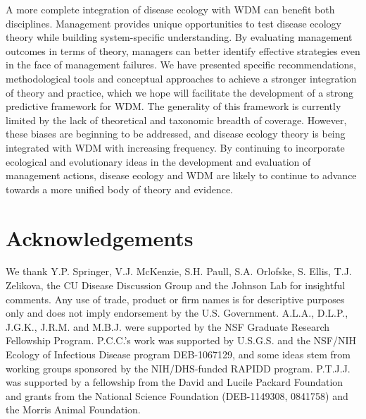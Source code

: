 A more complete integration of disease ecology with WDM can benefit both disciplines.
Management provides unique opportunities to test disease ecology theory while building system-specific understanding.
By evaluating management outcomes in terms of theory, managers can better identify effective strategies even in the face of management failures.
We have presented specific recommendations, methodological tools and conceptual approaches to achieve a stronger integration of theory and practice, which we hope will facilitate the development of a strong predictive framework for WDM.
The generality of this framework is currently limited by the lack of theoretical and taxonomic breadth of coverage.
However, these biases are beginning to be addressed, and disease ecology theory is being integrated with WDM with increasing frequency. By continuing to incorporate ecological and evolutionary ideas in the development and evaluation of management actions, disease ecology and WDM are likely to continue to advance towards a more unified body of theory and evidence.

\section{Acknowledgements}

We thank Y.P. Springer, V.J. McKenzie, S.H. Paull, S.A. Orlofske, S. Ellis, T.J. Zelikova, the CU Disease Discussion Group and the Johnson Lab for insightful comments.
Any use of trade, product or firm names is for descriptive purposes only and does not imply endorsement by the U.S. Government.
A.L.A., D.L.P., J.G.K., J.R.M. and M.B.J. were supported by the NSF Graduate Research Fellowship Program.
P.C.C.'s work was supported by U.S.G.S. and the NSF/NIH Ecology of Infectious Disease program DEB-1067129, and some ideas stem from working groups sponsored by the NIH/DHS-funded RAPIDD program.
P.T.J.J. was supported by a fellowship from the David and Lucile Packard Foundation and grants from the National Science Foundation (DEB-1149308, 0841758) and the Morris Animal Foundation.



